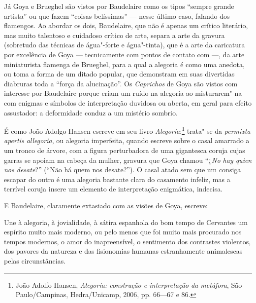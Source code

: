 Já Goya e Brueghel são vistos por Baudelaire como os tipos “sempre
grande artista” ou que fazem “coisas belíssimas” --- nesse último caso,
falando dos flamengos. Ao abordar os dois, Baudelaire, que não é apenas
um crítico literário, mas muito talentoso e cuidadoso crítico de arte,
separa a arte da gravura (sobretudo das técnicas de água"-forte e
água"-tinta), que é a arte da caricatura por excelência de Goya ---
tecnicamente com pontos de contato com  ---, da arte
miniaturista flamenga de Brueghel, para a qual a alegoria é como uma anedota,
ou toma a forma de um ditado popular, que demonstram em suas divertidas
diabruras toda a “força da alucinação”. Os \textit{Caprichos} de Goya
são vistos com interesse por Baudelaire porque criam um ruído na
alegoria ao misturarem"-na com enigmas e símbolos de interpretação
duvidosa ou aberta, em geral para efeito assustador: a deformidade
conduz a um mistério sombrio.

É como João Adolgo Hansen escreve em seu livro
\textit{Alegoria}:\footnote{ João Adolfo Hansen, \textit{Alegoria:
construção e interpretação da metáfora}, São Paulo/Campinas,
Hedra/Unicamp, 2006, pp. 66---67 e 86.} trata"-se da
\textit{permixta apertis allegoria}, ou alegoria imperfeita, quando
escreve sobre o casal amarrado a um tronco de árvore, com a figura
perturbadora de uma gigantesca coruja cujas garras se apoiam na cabeça
da mulher, gravura que Goya chamou “¿\textit{No hay quien nos desate}?”
(``Não há quem nos desate?''). O casal atado sem que um consiga
escapar do outro é uma alegoria bastante clara do casamento infeliz,
mas a terrível coruja insere um elemento de interpretação enigmática,
indecisa.

E Baudelaire, claramente extasiado com as visões de Goya, escreve: 

\begin{hedraquote}
Une à alegoria, à jovialidade, à sátira espanhola do bom tempo de
Cervantes um espírito muito mais moderno, ou pelo menos que foi muito
mais procurado nos tempos modernos, o amor do inapreensível, o
sentimento dos contrastes violentos, dos pavores da natureza e das
fisionomias humanas estranhamente animalescas pelas circunstâncias.
\end{hedraquote}

